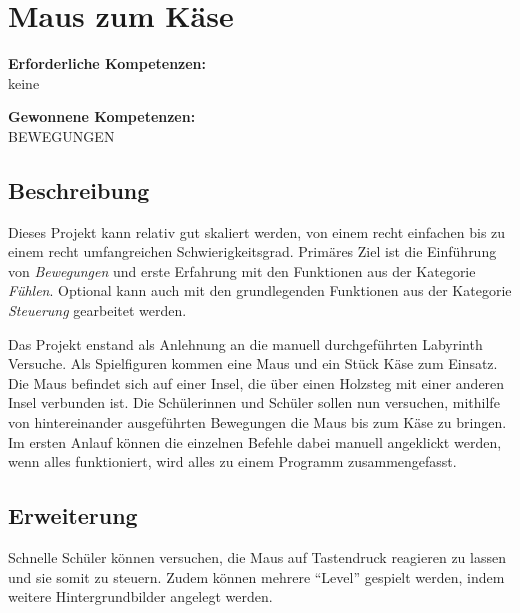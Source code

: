 \section{Maus zum Käse}\label{maus-zum-kuxe4se}

\textbf{Erforderliche Kompetenzen:}\\
keine

\textbf{Gewonnene Kompetenzen:}\\
BEWEGUNGEN

\begin{figure}[ht]
    \centering 
    \caption[\Sectionname]{\Sectionname}
\end{figure}

\subsection{Beschreibung}\label{beschreibung}

Dieses Projekt kann relativ gut skaliert werden, von einem recht
einfachen bis zu einem recht umfangreichen Schwierigkeitsgrad. Primäres
Ziel ist die Einführung von \emph{Bewegungen} und erste Erfahrung mit
den Funktionen aus der Kategorie \emph{Fühlen}. Optional kann auch mit
den grundlegenden Funktionen aus der Kategorie \emph{Steuerung}
gearbeitet werden.

Das Projekt enstand als Anlehnung an die manuell durchgeführten
Labyrinth Versuche. Als Spielfiguren kommen eine Maus und ein Stück Käse
zum Einsatz. Die Maus befindet sich auf einer Insel, die über einen
Holzsteg mit einer anderen Insel verbunden ist. Die Schülerinnen und
Schüler sollen nun versuchen, mithilfe von hintereinander ausgeführten
Bewegungen die Maus bis zum Käse zu bringen. Im ersten Anlauf können die
einzelnen Befehle dabei manuell angeklickt werden, wenn alles
funktioniert, wird alles zu einem Programm zusammengefasst.

\subsection{Erweiterung}\label{erweiterung}

Schnelle Schüler können versuchen, die Maus auf Tastendruck reagieren zu
lassen und sie somit zu steuern. Zudem können mehrere ``Level'' gespielt
werden, indem weitere Hintergrundbilder angelegt werden.
